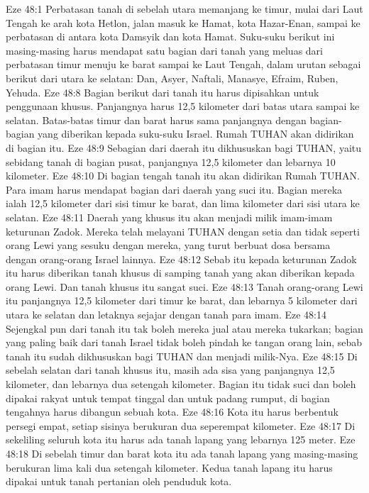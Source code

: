 Eze 48:1  Perbatasan tanah di sebelah utara memanjang ke timur, mulai dari Laut Tengah ke arah kota Hetlon, jalan masuk ke Hamat, kota Hazar-Enan, sampai ke perbatasan di antara kota Damsyik dan kota Hamat. Suku-suku berikut ini masing-masing harus mendapat satu bagian dari tanah yang meluas dari perbatasan timur menuju ke barat sampai ke Laut Tengah, dalam urutan sebagai berikut dari utara ke selatan: Dan, Asyer, Naftali, Manasye, Efraim, Ruben, Yehuda.
Eze 48:8  Bagian berikut dari tanah itu harus dipisahkan untuk penggunaan khusus. Panjangnya harus 12,5 kilometer dari batas utara sampai ke selatan. Batas-batas timur dan barat harus sama panjangnya dengan bagian-bagian yang diberikan kepada suku-suku Israel. Rumah TUHAN akan didirikan di bagian itu.
Eze 48:9  Sebagian dari daerah itu dikhususkan bagi TUHAN, yaitu sebidang tanah di bagian pusat, panjangnya 12,5 kilometer dan lebarnya 10 kilometer.
Eze 48:10  Di bagian tengah tanah itu akan didirikan Rumah TUHAN. Para imam harus mendapat bagian dari daerah yang suci itu. Bagian mereka ialah 12,5 kilometer dari sisi timur ke barat, dan lima kilometer dari sisi utara ke selatan.
Eze 48:11  Daerah yang khusus itu akan menjadi milik imam-imam keturunan Zadok. Mereka telah melayani TUHAN dengan setia dan tidak seperti orang Lewi yang sesuku dengan mereka, yang turut berbuat dosa bersama dengan orang-orang Israel lainnya.
Eze 48:12  Sebab itu kepada keturunan Zadok itu harus diberikan tanah khusus di samping tanah yang akan diberikan kepada orang Lewi. Dan tanah khusus itu sangat suci.
Eze 48:13  Tanah orang-orang Lewi itu panjangnya 12,5 kilometer dari timur ke barat, dan lebarnya 5 kilometer dari utara ke selatan dan letaknya sejajar dengan tanah para imam.
Eze 48:14  Sejengkal pun dari tanah itu tak boleh mereka jual atau mereka tukarkan; bagian yang paling baik dari tanah Israel tidak boleh pindah ke tangan orang lain, sebab tanah itu sudah dikhususkan bagi TUHAN dan menjadi milik-Nya.
Eze 48:15  Di sebelah selatan dari tanah khusus itu, masih ada sisa yang panjangnya 12,5 kilometer, dan lebarnya dua setengah kilometer. Bagian itu tidak suci dan boleh dipakai rakyat untuk tempat tinggal dan untuk padang rumput, di bagian tengahnya harus dibangun sebuah kota.
Eze 48:16  Kota itu harus berbentuk persegi empat, setiap sisinya berukuran dua seperempat kilometer.
Eze 48:17  Di sekeliling seluruh kota itu harus ada tanah lapang yang lebarnya 125 meter.
Eze 48:18  Di sebelah timur dan barat kota itu ada tanah lapang yang masing-masing berukuran lima kali dua setengah kilometer. Kedua tanah lapang itu harus dipakai untuk tanah pertanian oleh penduduk kota.
